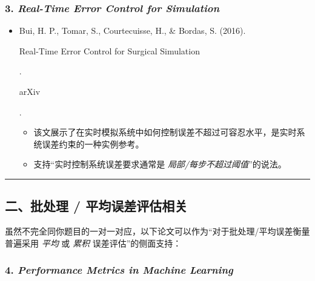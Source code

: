 \documentclass[
]{article}
\begin{document}
\subsubsection{\texorpdfstring{3. \emph{Real-Time Error Control for
Simulation}}{3. Real-Time Error Control for Simulation}}\label{3-real-time-error-control-for-simulation}

\begin{itemize}
\item
  Bui, H. P., Tomar, S., Courtecuisse, H., \& Bordas, S. (2016).

  Real-Time Error Control for Surgical Simulation

  .

  arXiv

  .

  \begin{itemize}
  \item
    该文展示了在实时模拟系统中如何控制误差不超过可容忍水平，是实时系统误差约束的一种实例参考。
  \item
    支持``实时控制系统误差要求通常是
    \emph{局部/每步不超过阈值}''的说法。
  \end{itemize}
\end{itemize}

\begin{center}\rule{0.5\linewidth}{0.5pt}\end{center}

\subsection{二、批处理 /
平均误差评估相关}\label{ux4e8cux6279ux5904ux7406--ux5e73ux5747ux8befux5deeux8bc4ux4f30ux76f8ux5173}

虽然不完全同你题目的一对一对应，以下论文可以作为``对于批处理/平均误差衡量普遍采用
\emph{平均} 或 \emph{累积} 误差评估''的侧面支持：

\subsubsection{\texorpdfstring{4. \emph{Performance Metrics in Machine
Learning}}{4. Performance Metrics in Machine Learning}}\label{4-performance-metrics-in-machine-learning}
\end{document}

